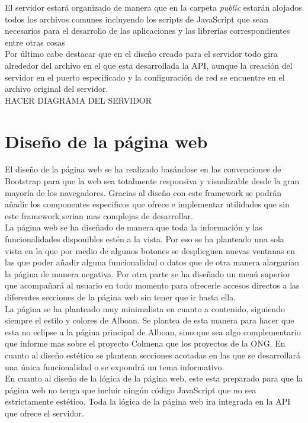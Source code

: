 El servidor estará organizado de manera que en la carpeta \textit{public} estarán alojados todos los archivos comunes incluyendo los scripts de JavaScript que sean necesarios para el desarrollo de las aplicaciones y las librerías correspondientes entre otras cosas\\

Por último cabe destacar que en el diseño creado para el servidor todo gira alrededor del archivo en el que esta desarrollada la API, aunque la creación del servidor en el puerto especificado y la configuración de red se encuentre en el archivo original del servidor.\\

HACER DIAGRAMA DEL SERVIDOR

\section{Diseño de la página web}
El diseño de la página web se ha realizado basándose en las convenciones de Bootstrap para que la web sea totalmente responsiva y visualizable desde la gran mayoría de los navegadores. Gracias al diseño con este framework se podrán añadir los componentes especificos que ofrece e implementar utilidades que sin este framework serian mas complejas de desarrollar.\\

La página web se ha diseñado de manera que toda la información y las funcionalidades disponibles estén a la vista. Por eso se ha planteado una sola vista en la que por medio de algunos botones se desplieguen nuevas ventanas en las que poder añadir alguna funcionalidad o datos que de otra manera alargarían la página de manera negativa. Por otra parte se ha diseñado un menú superior que acompañará al usuario en todo momento para ofrecerle accesos directos a las diferentes secciones de la página web sin tener que ir hasta ella.\\

La página se ha planteado muy minimalista en cuanto a contenido, siguiendo siempre el estilo y colores de Alboan. Se plantea de esta manera para hacer que esta no eclipse a la página principal de Alboan, sino que sea algo complementario que informe mas sobre el proyecto Colmena que los proyectos de la ONG. En cuanto al diseño estético se plantean secciones acotadas en las que se desarrollará una única funcionalidad o se expondrá un tema informativo.\\

En cuanto al diseño de la lógica de la página web, este esta preparado para que la página web no tenga que incluir ningún código JavaScript que no sea estrictamente estético. Toda la lógica de la página web ira integrada en la API que ofrece el servidor.\\

